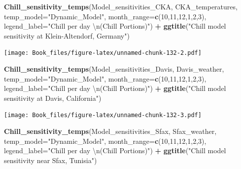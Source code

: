 \documentclass[
]{book}
\newenvironment{Shaded}{\begin{snugshade}}{\end{snugshade}}
\newcommand{\CharTok}[1]{\textcolor[rgb]{0.31,0.60,0.02}{#1}}
\newcommand{\DataTypeTok}[1]{\textcolor[rgb]{0.13,0.29,0.53}{#1}}
\newcommand{\DecValTok}[1]{\textcolor[rgb]{0.00,0.00,0.81}{#1}}
\newcommand{\KeywordTok}[1]{\textcolor[rgb]{0.13,0.29,0.53}{\textbf{#1}}}
\newcommand{\NormalTok}[1]{#1}
\newcommand{\OperatorTok}[1]{\textcolor[rgb]{0.81,0.36,0.00}{\textbf{#1}}}
\newcommand{\StringTok}[1]{\textcolor[rgb]{0.31,0.60,0.02}{#1}}
\begin{document}
\begin{Shaded}
\begin{Highlighting}[]
\KeywordTok{Chill_sensitivity_temps}\NormalTok{(Model_sensitivities_CKA,}
\NormalTok{                        CKA_temperatures,}
                        \DataTypeTok{temp_model=}\StringTok{"Dynamic_Model"}\NormalTok{,}
                        \DataTypeTok{month_range=}\KeywordTok{c}\NormalTok{(}\DecValTok{10}\NormalTok{,}\DecValTok{11}\NormalTok{,}\DecValTok{12}\NormalTok{,}\DecValTok{1}\NormalTok{,}\DecValTok{2}\NormalTok{,}\DecValTok{3}\NormalTok{),}
                        \DataTypeTok{legend_label=}\StringTok{"Chill per day }\CharTok{\textbackslash{}n}\StringTok{(Chill Portions)"}\NormalTok{) }\OperatorTok{+}
\StringTok{  }\KeywordTok{ggtitle}\NormalTok{(}\StringTok{"Chill model sensitivity at Klein-Altendorf, Germany"}\NormalTok{)}
\end{Highlighting}
\end{Shaded}

\texttt{[image: Book\_files/figure-latex/unnamed-chunk-132-2.pdf]}

\begin{Shaded}
\begin{Highlighting}[]
\KeywordTok{Chill_sensitivity_temps}\NormalTok{(Model_sensitivities_Davis,}
\NormalTok{                        Davis_weather,}
                        \DataTypeTok{temp_model=}\StringTok{"Dynamic_Model"}\NormalTok{,}
                        \DataTypeTok{month_range=}\KeywordTok{c}\NormalTok{(}\DecValTok{10}\NormalTok{,}\DecValTok{11}\NormalTok{,}\DecValTok{12}\NormalTok{,}\DecValTok{1}\NormalTok{,}\DecValTok{2}\NormalTok{,}\DecValTok{3}\NormalTok{),}
                        \DataTypeTok{legend_label=}\StringTok{"Chill per day }\CharTok{\textbackslash{}n}\StringTok{(Chill Portions)"}\NormalTok{) }\OperatorTok{+}
\StringTok{  }\KeywordTok{ggtitle}\NormalTok{(}\StringTok{"Chill model sensitivity at Davis, California"}\NormalTok{)}
\end{Highlighting}
\end{Shaded}

\texttt{[image: Book\_files/figure-latex/unnamed-chunk-132-3.pdf]}

\begin{Shaded}
\begin{Highlighting}[]
\KeywordTok{Chill_sensitivity_temps}\NormalTok{(Model_sensitivities_Sfax,}
\NormalTok{                        Sfax_weather,}
                        \DataTypeTok{temp_model=}\StringTok{"Dynamic_Model"}\NormalTok{,}
                        \DataTypeTok{month_range=}\KeywordTok{c}\NormalTok{(}\DecValTok{10}\NormalTok{,}\DecValTok{11}\NormalTok{,}\DecValTok{12}\NormalTok{,}\DecValTok{1}\NormalTok{,}\DecValTok{2}\NormalTok{,}\DecValTok{3}\NormalTok{),}
                        \DataTypeTok{legend_label=}\StringTok{"Chill per day }\CharTok{\textbackslash{}n}\StringTok{(Chill Portions)"}\NormalTok{) }\OperatorTok{+}
\StringTok{  }\KeywordTok{ggtitle}\NormalTok{(}\StringTok{"Chill model sensitivity near Sfax, Tunisia"}\NormalTok{)}
\end{Highlighting}
\end{Shaded}
\end{document}
